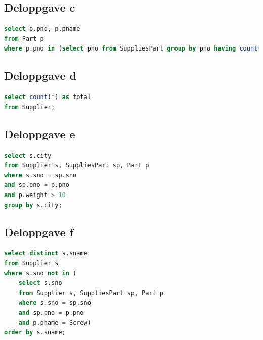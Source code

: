 \documentclass[a4paper, 12pt] {article}
\begin{document}
\subsection{Deloppgave c}

\begin{lstlisting}[language=SQL, label=oppg5c, caption=Oppgave 5c]
select p.pno, p.pname 
from Part p 
where p.pno in (select pno from SuppliesPart group by pno having count(*) > 1);
\end{lstlisting}

\subsection{Deloppgave d}

\begin{lstlisting}[language=SQL, label=oppg5d, caption=Oppgave 5d]
select count(*) as total 
from Supplier;
\end{lstlisting}

\subsection{Deloppgave e}

\begin{lstlisting}[language=SQL, label=oppg5e, caption=Oppgave 5e]
select s.city 
from Supplier s, SuppliesPart sp, Part p 
where s.sno = sp.sno 
and sp.pno = p.pno 
and p.weight > 10 
group by s.city;
\end{lstlisting}

\newpage
\subsection{Deloppgave f}

\begin{lstlisting}[language=SQL, label=oppg5f, caption=Oppgave 5f]
select distinct s.sname
from Supplier s
where s.sno not in (
    select s.sno
    from Supplier s, SuppliesPart sp, Part p
    where s.sno = sp.sno
    and sp.pno = p.pno
    and p.pname = Screw)
order by s.sname;
\end{lstlisting}
\end{document}
